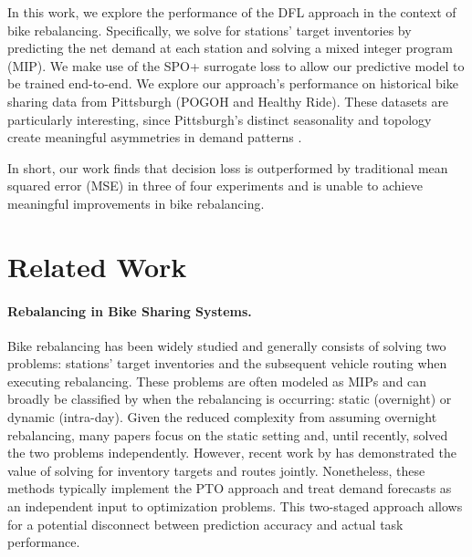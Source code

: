 \documentclass{article}
\begin{document}
In this work, we explore the performance of the DFL approach in the context of bike rebalancing. Specifically, we solve for stations' target inventories by predicting the net demand at each station and solving a mixed integer program (MIP).
We make use of the SPO+ surrogate loss to allow our predictive model to be trained end-to-end. We explore our approach's performance on historical bike sharing
data from Pittsburgh (POGOH and Healthy Ride). These datasets are particularly interesting, since Pittsburgh's distinct seasonality and topology create meaningful asymmetries in demand patterns \cite{kim2020pgh}.

In short, our work finds that decision loss is outperformed by traditional mean squared error (MSE) in three of four experiments and is unable to achieve meaningful improvements in bike rebalancing. 

\section{Related Work}

\paragraph{Rebalancing in Bike Sharing Systems.}
Bike rebalancing has been widely studied and generally consists of solving two problems: stations' target inventories and the subsequent vehicle routing when executing rebalancing. These problems are often modeled as 
MIPs \cite{ejor2024rebalancing} and can broadly be classified by when the rebalancing is occurring: static (overnight) or dynamic (intra-day). Given the reduced complexity from assuming overnight rebalancing, many papers focus on the static setting and, until recently,
solved the two problems independently. However, recent work by \citet{schuijbroek2017irvr} has demonstrated the value of solving for inventory targets and routes jointly. Nonetheless, these methods typically implement the PTO approach and treat 
demand forecasts as an independent input to optimization problems. This two-staged approach allows for a potential disconnect between prediction accuracy and actual task performance.
\end{document}
